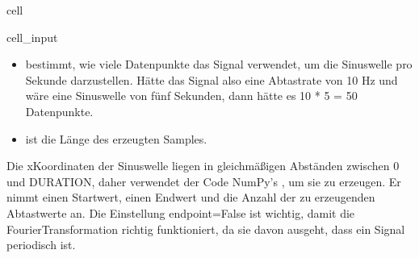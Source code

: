 \documentclass[letterpaper,10pt,english]{jupyterBook}
\begin{document}
\begin{sphinxuseclass}{cell}\begin{sphinxVerbatimInput}

\begin{sphinxuseclass}{cell_input}
\begin{sphinxVerbatim}[commandchars=\\\{\}]
   
           
        
          
      
\end{sphinxVerbatim}

\end{sphinxuseclass}\end{sphinxVerbatimInput}

\end{sphinxuseclass}\begin{itemize}
\item {} 
\sphinxAtStartPar
{} bestimmt, wie viele Datenpunkte das Signal verwendet, um die Sinuswelle pro Sekunde darzustellen. Hätte das Signal also eine Abtastrate von 10 Hz und wäre eine Sinuswelle von fünf Sekunden, dann hätte es 10 * 5 = 50 Datenpunkte.

\item {} 
\sphinxAtStartPar
{} ist die Länge des erzeugten Samples.

\end{itemize}

\sphinxAtStartPar
Die x\sphinxhyphen{}Koordinaten der Sinuswelle liegen in gleichmäßigen Abständen zwischen 0 und DURATION, daher verwendet der Code NumPy’s , um sie zu erzeugen. Er nimmt einen Startwert, einen Endwert und die Anzahl der zu erzeugenden Abtastwerte an. Die Einstellung endpoint=False ist wichtig, damit die Fourier\sphinxhyphen{}Transformation richtig funktioniert, da sie davon ausgeht, dass ein Signal periodisch ist.
\end{document}
